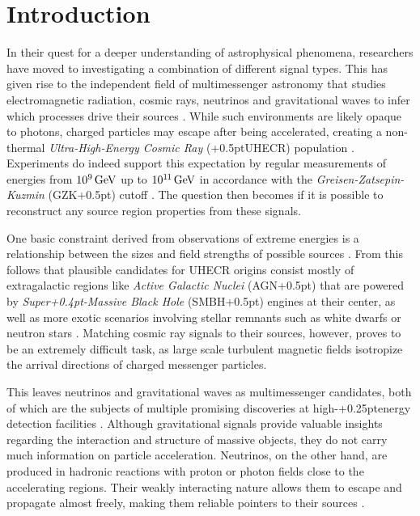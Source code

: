 \chapter{Introduction}
\label{ch:introduction}

In their quest for a deeper understanding of astrophysical phenomena, researchers have moved to investigating
a combination of different signal types. This has given rise to the independent field of multimessenger astronomy
that studies electromagnetic radiation, cosmic rays, neutrinos and gravitational waves to infer which processes
drive their sources \cite{Meszaros_2019}. While such environments are likely opaque to photons, charged
particles may escape after being accelerated, creating a non-thermal \emph{Ultra-High-Energy Cosmic Ray}
({\kern+0.5pt}UHECR) population \cite{Becker_2008}. Experiments do indeed support this expectation by regular
measurements of energies from $10^{9}{\kern+1.5pt}\unit{\giga\electronvolt}$ up to
$10^{1{\kern-0.3pt}1}{\kern+1.5pt}\unit{\giga\electronvolt}$ in accordance with the
\emph{Greisen-Zatsepin-Kuzmin} (GZK{\kern+0.5pt}) cutoff \cite{pa}. The question then
becomes if it is possible to reconstruct any source region properties from these signals.

One basic constraint derived from observations of extreme energies is a relationship between the sizes and field
strengths of possible sources \cite{Hillas_1984}. From this follows that plausible candidates for UHECR origins
consist mostly of extragalactic regions like \emph{Active Galactic Nuclei} (AGN{\kern+0.5pt}) that are powered
by \emph{Super{\kern+0.4pt}-Massive Black Hole} (SMBH{\kern+0.5pt}) engines at their center, as well as more exotic
scenarios involving stellar remnants such as white dwarfs or neutron stars \cite{Tjus_2020, Gabici_2019, Drury_2012}.
Matching cosmic ray signals to their sources, however, proves to be an extremely difficult task, as large scale
turbulent magnetic fields isotropize the arrival directions of charged messenger particles.

This leaves neutrinos and gravitational waves as multimessenger candidates, both of which are the subjects of multiple
promising discoveries at high-{\kern+0.25pt}energy detection facilities \cite{ic_first_evidence, ic_more_evidence, ligo}.
Although gravitational signals provide valuable insights regarding the interaction and structure of massive objects,
they do not carry much information on particle acceleration. Neutrinos, on the other hand, are produced in hadronic
reactions with proton or photon fields close to the accelerating regions. Their weakly interacting nature allows them
to escape and propagate almost freely, making them reliable pointers to their sources \cite{Becker_2008}.

